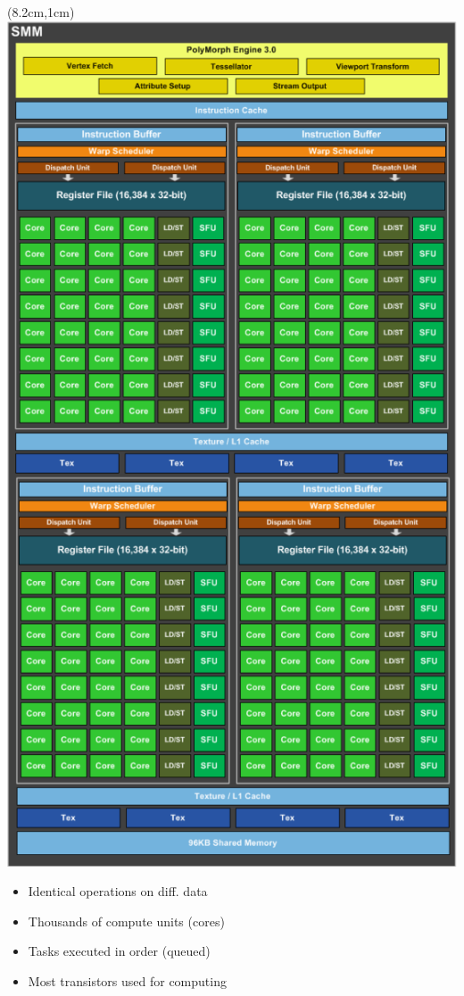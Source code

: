 \documentclass{beamer}
\begin{document}
\begin{frame}[fragile]
\begin{textblock*}{4cm}(8.2cm,1cm)
\includegraphics[width=\textwidth]{graphics/gtx980}
\end{textblock*}

\begin{itemize}
\item Identical operations on diff. data
\item Thousands of compute units (cores)
\item Tasks executed in order (queued)
\item Most transistors used for computing
\end{itemize}

\end{frame}
\end{document}
